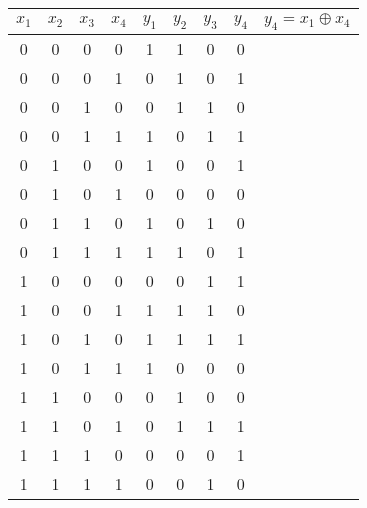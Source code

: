 \begin{example}
\begin{center}
\end{center}
\begin{table}[h!]\centering
\renewcommand{\arraystretch}{1.25}
\begin{tabular}{cccc|cccc|c}
	\hline
	$x_1$ & $x_2$ & $x_3$ & $x_4$ & $y_1$ & $y_2$ & $y_3$ & $y_4$ & $y_4=x_1\oplus x_4$ \\
	\hline
	0 & 0 & 0 & 0 & 1 & 1 & 0 & 0 & \textcolor{green}{\checkmark}\\
	0 & 0 & 0 & 1 & 0 & 1 & 0 & 1 & \textcolor{green}{\checkmark}\\
	0 & 0 & 1 & 0 & 0 & 1 & 1 & 0 & \textcolor{green}{\checkmark}\\
	0 & 0 & 1 & 1 & 1 & 0 & 1 & 1 & \textcolor{green}{\checkmark}\\
	0 & 1 & 0 & 0 & 1 & 0 & 0 & 1 & \textcolor{red}{\xmark}\\
	0 & 1 & 0 & 1 & 0 & 0 & 0 & 0 & \textcolor{red}{\xmark}\\
	0 & 1 & 1 & 0 & 1 & 0 & 1 & 0 & \textcolor{green}{\checkmark}\\
	0 & 1 & 1 & 1 & 1 & 1 & 0 & 1 & \textcolor{green}{\checkmark}\\
	1 & 0 & 0 & 0 & 0 & 0 & 1 & 1 & \textcolor{green}{\checkmark}\\
	1 & 0 & 0 & 1 & 1 & 1 & 1 & 0 & \textcolor{green}{\checkmark}\\
	1 & 0 & 1 & 0 & 1 & 1 & 1 & 1 & \textcolor{green}{\checkmark}\\
	1 & 0 & 1 & 1 & 1 & 0 & 0 & 0 & \textcolor{green}{\checkmark}\\
	1 & 1 & 0 & 0 & 0 & 1 & 0 & 0 & \textcolor{red}{\xmark}\\
	1 & 1 & 0 & 1 & 0 & 1 & 1 & 1 & \textcolor{red}{\xmark}\\
	1 & 1 & 1 & 0 & 0 & 0 & 0 & 1 & \textcolor{green}{\checkmark}\\
	1 & 1 & 1 & 1 & 0 & 0 & 1 & 0 & \textcolor{green}{\checkmark}\\
	\hline
\end{tabular}
\end{table}
\end{example}

\newpage

